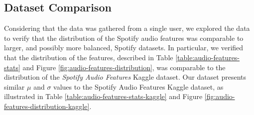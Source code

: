\documentclass[sn-mathphys]{sn-jnl}%
\theoremstyle{thmstyleone}%
\theoremstyle{thmstyletwo}%
\theoremstyle{thmstylethree}%
\begin{document}
\subsection{Dataset Comparison}

Considering that the data was gathered from a single user,
we explored the data to verify that the distribution of the Spotify audio features
was comparable to larger, and possibly more balanced, Spotify datasets.
In particular, we verified that the distribution of the features,
described in Table \ref{table:audio-features-stats} and Figure \ref{fig:audio-features-distribution},
was comparable to the distribution of the \emph{Spotify Audio Features} Kaggle dataset.
Our dataset presents similar $\mu$ and $\sigma$ values to the Spotify Audio Features Kaggle dataset,
as illustrated in Table \ref{table:audio-features-stats-kaggle}
and Figure \ref{fig:audio-features-distribution-kaggle}.

\end{document}
